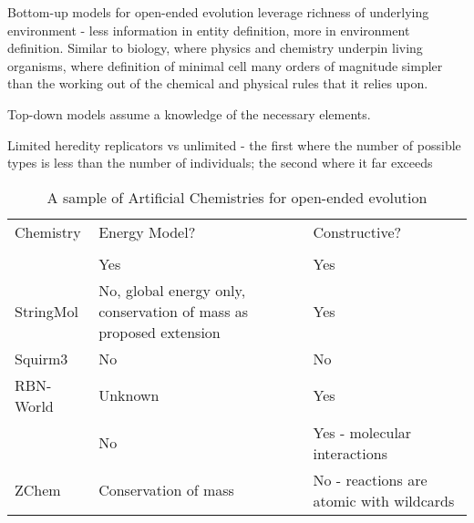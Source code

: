 Bottom-up models for open-ended evolution leverage richness of underlying environment - less information in entity definition, more in environment definition. Similar to biology, where physics and chemistry underpin living organisms, where definition of minimal cell many orders of magnitude simpler than the working out of the chemical and physical rules that it relies upon.

Top-down models assume a knowledge of the necessary elements.

Limited heredity replicators vs unlimited - the first where the number of possible types is less than the number of individuals; the second where it far exceeds\cite{Szathmary:2006ty}

\begin{table}
	\scriptsize
	\caption{A sample of Artificial Chemistries for open-ended evolution}
	\label{tab1}
	\begin{tabular}{@{}p{4cm}p{4.5cm}p{4.5cm}@{}}
		\hline\noalign{\smallskip}
		Chemistry                                                          & Energy Model?                                                      & Constructive?                            \\ 
		\\ \noalign{\smallskip}
		\hline
		\noalign{\smallskip}
		\cite{Ducharme2012}                                                & Yes                                                                & Yes                                      \\
		StringMol \parencite{Hickinbotham2012}                             & No, global energy only, conservation of mass as proposed extension & Yes                                      \\
		Squirm3 \parencite{Hutton2002,Lucht2012}                           & No                                                                 & No                                       \\
		RBN-World \parencite{Faulconbridge2011}                            & Unknown                                                            & Yes                                      \\
		\cite{Lenaerts2009}                                                & No                                                                 & Yes - molecular interactions             \\
		ZChem \parencite{Tominaga2009}                                     & Conservation of mass                                               & No - reactions are atomic with wildcards \\

\end{tabular}
\end{table}
